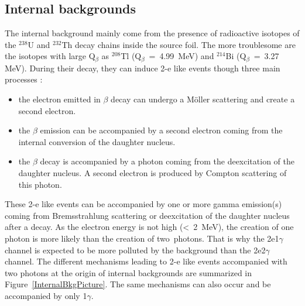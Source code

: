 \documentclass[main.tex]{subfiles}
\begin{document}
\subsection{Internal backgrounds}


\NI The internal background mainly come from the presence of radioactive isotopes of the $^{\text{238}}$U and $^{\text{232}}$Th decay chains inside the source foil. The more troublesome are the isotopes with large Q$_\beta$ as $^{\text{208}}$Tl (Q$_\beta$~=~4.99~MeV) and $^{\text{214}}$Bi (Q$_{\beta}$~=~3.27 MeV). During their decay, they can induce 2-e like events though three main processes :


\begin{itemize}
\item the electron emitted in $\beta$ decay can undergo a M\"oller scattering and create a second electron.
\item the $\beta$ emission can be accompanied by a second electron coming from the internal conversion of the daughter nucleus.
\item the $\beta$ decay is accompanied by a photon coming from the deexcitation of the daughter nucleus. A second electron is produced by Compton scattering of this photon.
\end{itemize} 




\NI These 2-e like events can be accompanied by one or more gamma emission(s) coming from Bremsstrahlung scattering or deexcitation of the  daughter nucleus after a decay. As the electron energy is not high (<~2~MeV), the creation of one photon is more likely than the creation of two~photons. That is why the 2e1$\gamma$ channel is expected to be more polluted by the background than the 2e2$\gamma$ channel. The different mechanisms leading to 2-e like events accompanied with two photons at the origin of internal backgrounds are summarized in Figure~\ref{InternalBkgPicture}. The same mechanisms can also occur and be accompanied by only 1$\gamma$.
\end{document}
